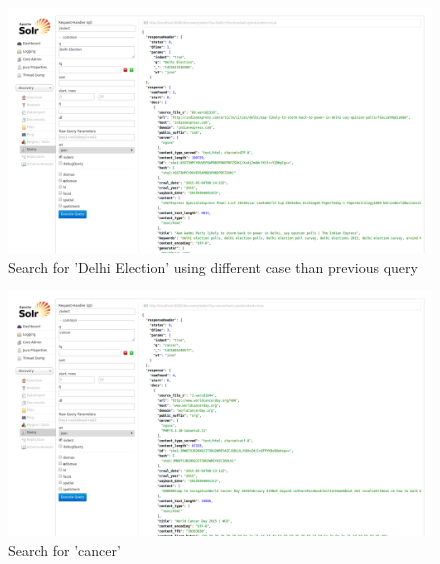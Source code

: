 \begin{figure}[ht]    
    \begin{center}
        \includegraphics[width=\paperwidth]{query5.png}
        \caption{Search for 'Delhi Election' using different case than previous query}
    \end{center}
\end{figure}

\begin{figure}[ht]    
    \begin{center}
        \includegraphics[width=\paperwidth]{query6.png}
        \caption{Search for 'cancer'}
    \end{center}
\end{figure}
